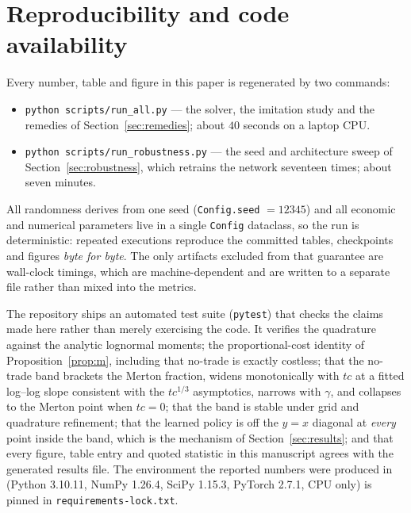 \documentclass[11pt]{article}
\begin{document}
\section*{Reproducibility and code availability}

Every number, table and figure in this paper is regenerated by two commands:
\begin{itemize}
\setlength{\itemsep}{2pt}
\item \texttt{python scripts/run\_all.py} --- the solver, the imitation study
and the remedies of Section~\ref{sec:remedies}; about $40$ seconds on a laptop
CPU.
\item \texttt{python scripts/run\_robustness.py} --- the seed and architecture
sweep of Section~\ref{sec:robustness}, which retrains the network seventeen
times; about seven minutes.
\end{itemize}
\noindent
All randomness derives from one seed (\texttt{Config.seed}
$=12345$) and all economic and numerical parameters live in a single
\texttt{Config} dataclass, so the run is deterministic: repeated executions
reproduce the committed tables, checkpoints and figures \emph{byte for byte}.
The only artifacts excluded from that guarantee are wall-clock timings, which
are machine-dependent and are written to a separate file rather than mixed
into the metrics.

The repository ships an automated test suite (\texttt{pytest}) that checks the
claims made here rather than merely exercising the code. It verifies the
quadrature against the analytic lognormal moments; the proportional-cost
identity of Proposition~\ref{prop:m}, including that no-trade is exactly
costless; that the no-trade band brackets the Merton fraction, widens
monotonically with $tc$ at a fitted log--log slope consistent with the
$tc^{1/3}$ asymptotics, narrows with $\gamma$, and collapses to the Merton
point when $tc=0$; that the band is stable under grid and quadrature
refinement; that the learned policy is off the $y=x$ diagonal at
\emph{every} point inside the band, which is the mechanism of
Section~\ref{sec:results}; and that every figure, table entry and quoted
statistic in this manuscript agrees with the generated results file. The
environment the reported numbers were produced in (Python 3.10.11, NumPy
1.26.4, SciPy 1.15.3, PyTorch 2.7.1, CPU only) is pinned in
\texttt{requirements-lock.txt}.

\end{document}

